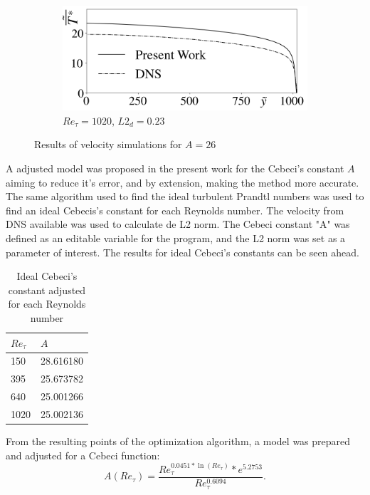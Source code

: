 \documentclass[10pt]{article} %
\begin{document}
\begin{figure}[!h]
\begin{subfigure}[t]{0.5\textwidth}
	\end{subfigure}
	\begin{subfigure}[t]{0.45\textwidth}
		\centering
		\includegraphics[angle=0, scale=0.24]{fotos_formatacao_final/Temperature_1000_Avelocity}
		\caption{$Re_\tau = 1020$, $L2_d = 0.23$}
	\end{subfigure}	
	\caption{Results of velocity simulations for $A = 26$}
	\label{figura_10}
\end{figure}

\newpage

A adjusted model was proposed in the present work for the Cebeci's constant $A$ aiming to reduce it's error, and by extension, making the method more accurate. The same algorithm used to find the ideal turbulent Prandtl numbers was used to find an ideal Cebecis's constant for each Reynolds number. The velocity from DNS available was used to calculate de L2 norm. The Cebeci constant "A" was defined as an editable variable for the program, and the L2 norm was set as a parameter of interest. The results for ideal Cebeci's constants can be seen ahead.

\begin{table}[!h]
	\centering
	\caption{Ideal Cebeci's constant adjusted for each Reynolds number}
	\begin{tabular}{ll}
		\hline
		$Re_\tau$ & $A$\\
		\hline
		150  &   28.616180\\
		395  &   25.673782\\
		640  &   25.001266\\
		1020 &   25.002136\\ 
		\hline
	\end{tabular}
	\label{tablea}
\end{table}

 From the resulting points of the optimization algorithm, a model was prepared and adjusted for a Cebeci function:
\begin{equation}
A \left( Re_\tau\right)= \frac{Re_\tau ^{0.0451 * \ln(Re_\tau)} *e ^ {5.2753} }{Re_\tau ^{0.6094}}.
\end{equation}
\end{document}
